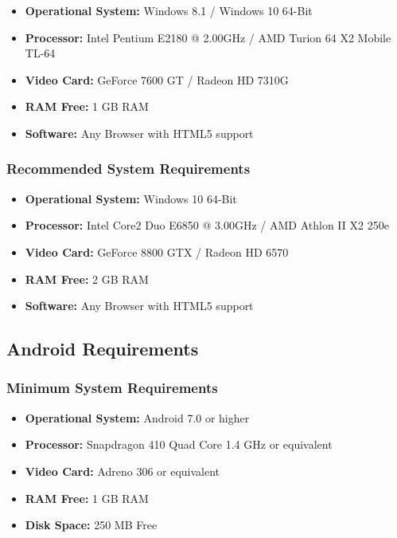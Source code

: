 \begin {itemize}	
	\item \textbf{Operational System:} Windows 8.1 / Windows 10 64-Bit
	\item \textbf{Processor: } Intel Pentium E2180 @ 2.00GHz / AMD Turion 64 X2 Mobile TL-64
	\item \textbf{Video Card:}  GeForce 7600 GT / Radeon HD 7310G
	\item \textbf{RAM Free:}  1 GB RAM
	\item \textbf{Software:} Any Browser with HTML5 support

\end {itemize}

\subsubsection{Recommended System Requirements}

\begin {itemize}	
	\item \textbf{Operational System:} Windows 10 64-Bit
	\item \textbf{Processor: } Intel Core2 Duo E6850 @ 3.00GHz / AMD Athlon II X2 250e
	\item \textbf{Video Card:}  GeForce 8800 GTX / Radeon HD 6570
	\item \textbf{RAM Free:}  2 GB RAM
	\item \textbf{Software:} Any Browser with HTML5 support

\end {itemize}

\subsection{Android Requirements}

\subsubsection{Minimum System Requirements}

\begin {itemize}	
	\item \textbf{Operational System:} Android 7.0 or higher
	\item \textbf{Processor: } Snapdragon 410 Quad Core 1.4 GHz or equivalent
	\item \textbf{Video Card:}  Adreno 306 or equivalent
	\item \textbf{RAM Free:}  1 GB RAM
	\item \textbf{Disk Space:} 250 MB Free


\end {itemize}

